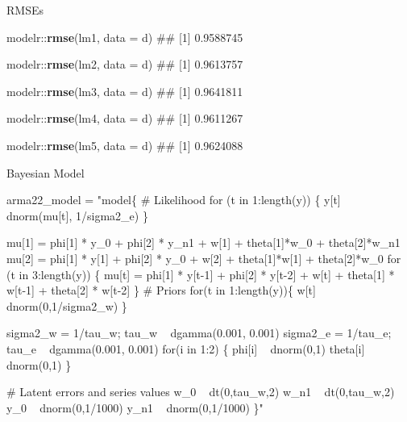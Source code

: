 \documentclass[11pt,ignorenonframetext,]{beamer}
\newenvironment{Shaded}{}{}
\newcommand{\DataTypeTok}[1]{\textcolor[rgb]{0.56,0.13,0.00}{#1}}
\newcommand{\KeywordTok}[1]{\textcolor[rgb]{0.00,0.44,0.13}{\textbf{#1}}}
\newcommand{\NormalTok}[1]{#1}
\newcommand{\OperatorTok}[1]{\textcolor[rgb]{0.40,0.40,0.40}{#1}}
\newcommand{\StringTok}[1]{\textcolor[rgb]{0.25,0.44,0.63}{#1}}
\let\oldShaded\Shaded
\let\endoldShaded\endShaded
\renewenvironment{Shaded}{\footnotesize\begin{spacing}{0.9}\oldShaded}{\endoldShaded\end{spacing}}
\let\oldverbatim\verbatim
\let\endoldverbatim\endverbatim
\newcommand{\tinyoutput}{
  \renewenvironment{Shaded}{\tiny\begin{spacing}{0.9}\oldShaded}{\endoldShaded\end{spacing}}
  \renewenvironment{verbatim}{\tiny\begin{spacing}{0.9}\oldverbatim}{\endoldverbatim\end{spacing}}
}
\begin{document}
\begin{frame}[fragile]{%
\protect\hypertarget{rmses}{%
RMSEs}}

\begin{Shaded}
\begin{Highlighting}[]
\NormalTok{modelr}\OperatorTok{::}\KeywordTok{rmse}\NormalTok{(lm1, }\DataTypeTok{data =}\NormalTok{ d)}
\NormalTok{## [1] 0.9588745}

\NormalTok{modelr}\OperatorTok{::}\KeywordTok{rmse}\NormalTok{(lm2, }\DataTypeTok{data =}\NormalTok{ d)}
\NormalTok{## [1] 0.9613757}

\NormalTok{modelr}\OperatorTok{::}\KeywordTok{rmse}\NormalTok{(lm3, }\DataTypeTok{data =}\NormalTok{ d)}
\NormalTok{## [1] 0.9641811}

\NormalTok{modelr}\OperatorTok{::}\KeywordTok{rmse}\NormalTok{(lm4, }\DataTypeTok{data =}\NormalTok{ d)}
\NormalTok{## [1] 0.9611267}

\NormalTok{modelr}\OperatorTok{::}\KeywordTok{rmse}\NormalTok{(lm5, }\DataTypeTok{data =}\NormalTok{ d)}
\NormalTok{## [1] 0.9624088}
\end{Highlighting}
\end{Shaded}

\end{frame}

\begin{frame}[fragile]{%
\protect\hypertarget{bayesian-model}{%
Bayesian Model}}

\tinyoutput

\begin{Shaded}
\begin{Highlighting}[]
\NormalTok{arma22_model =}\StringTok{ "model\{}
\StringTok{# Likelihood}
\StringTok{  for (t in 1:length(y)) \{}
\StringTok{    y[t] ~ dnorm(mu[t], 1/sigma2_e)}
\StringTok{  \}                                   }

\StringTok{  mu[1] = phi[1] * y_0  + phi[2] * y_n1 + w[1] + theta[1]*w_0  + theta[2]*w_n1}
\StringTok{  mu[2] = phi[1] * y[1] + phi[2] * y_0  + w[2] + theta[1]*w[1] + theta[2]*w_0   }
\StringTok{  for (t in 3:length(y)) \{ }
\StringTok{    mu[t] = phi[1] * y[t-1] + phi[2] * y[t-2] + w[t] + theta[1] * w[t-1] + theta[2] * w[t-2]}
\StringTok{  \}}
\StringTok{  }
\StringTok{# Priors}
\StringTok{  for(t in 1:length(y))\{}
\StringTok{    w[t] ~ dnorm(0,1/sigma2_w)}
\StringTok{  \}}

\StringTok{  sigma2_w = 1/tau_w; tau_w ~ dgamma(0.001, 0.001) }
\StringTok{  sigma2_e = 1/tau_e; tau_e ~ dgamma(0.001, 0.001) }
\StringTok{  for(i in 1:2) \{}
\StringTok{    phi[i] ~ dnorm(0,1)}
\StringTok{    theta[i] ~ dnorm(0,1)}
\StringTok{  \}}

\StringTok{# Latent errors and series values}
\StringTok{  w_0  ~ dt(0,tau_w,2)}
\StringTok{  w_n1 ~ dt(0,tau_w,2)}
\StringTok{  y_0  ~ dnorm(0,1/1000)}
\StringTok{  y_n1 ~ dnorm(0,1/1000)}
\StringTok{\}"}
\end{Highlighting}
\end{Shaded}

\end{frame}
\end{document}
